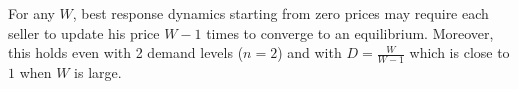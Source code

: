 \begin{theorem}
	For any $W$, %
	best response dynamics starting from zero prices may require each seller to update his price $W-1$ times
	to converge to an equilibrium.
	Moreover, this holds even with 2 demand levels ($n=2$) and with $D= \frac{W}{W-1}$ which is close to $1$ when $W$ is large.
\end{theorem}
